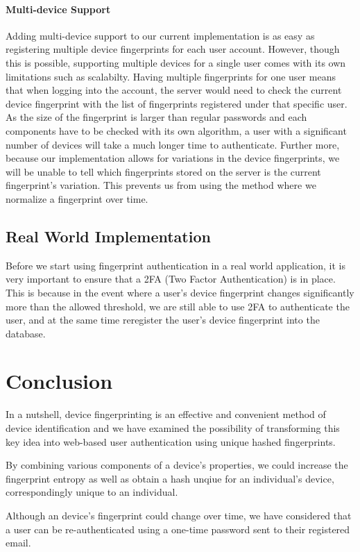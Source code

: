 \documentclass{acm_proc_article-sp}
\begin{document}
\paragraph{Multi-device Support}
Adding multi-device support to our current implementation is as easy as registering multiple device fingerprints for each user account. However, though this is possible, supporting multiple devices for a single user comes with its own limitations such as scalabilty. Having multiple fingerprints for one user means that when logging into the account, the server would need to check the current device fingerprint with the list of fingerprints registered under that specific user. As the size of the fingerprint is larger than regular passwords and each components have to be checked with its own algorithm, a user with a significant number of devices will take a much longer time to authenticate. Further more, because our implementation allows for  variations in the device fingerprints, we will be unable to tell which fingerprints stored on the server is the current fingerprint's variation. This prevents us from using the method where we normalize a fingerprint over time.

\subsection{Real World Implementation}
Before we start using fingerprint authentication in a real world application, it is very important to ensure that a 2FA (Two Factor Authentication) is in place. This is because in the event where a user's device fingerprint changes significantly more than the allowed threshold, we are still able to use 2FA to authenticate the user, and at the same time reregister the user's device fingerprint into the database.

\section{Conclusion}
In a nutshell, device fingerprinting is an effective and convenient method of device identification and we have examined the possibility of transforming this key idea into web-based user authentication using unique hashed fingerprints.

By combining various components of a device's properties, we could increase the fingerprint entropy as well as obtain a hash unqiue for an individual's device, correspondingly unique to an individual.

Although an device's fingerprint could change over time, we have considered that a user can be re-authenticated using a one-time password sent to their registered email.
\end{document}

